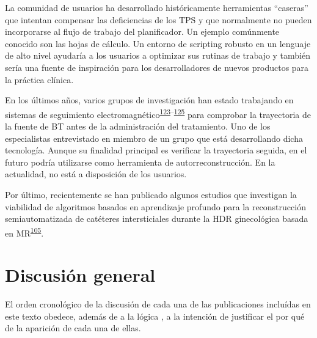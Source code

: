 \documentclass[
  a4paper,
]{scrreprt}
\begin{document}
La comunidad de usuarios ha desarrollado históricamente herramientas
``caseras'' que intentan compensar las deficiencias de los TPS y que
normalmente no pueden incorporarse al flujo de trabajo del planificador.
Un ejemplo comúnmente conocido son las hojas de cálculo. Un entorno de
scripting robusto en un lenguaje de alto nivel ayudaría a los usuarios a
optimizar sus rutinas de trabajo y también sería una fuente de
inspiración para los desarrolladores de nuevos productos para la
práctica clínica.

En los últimos años, varios grupos de investigación han estado
trabajando en sistemas de seguimiento
electromagnético\textsuperscript{\protect\hyperlink{ref-beld2018}{123}--\protect\hyperlink{ref-vanheerden2021}{125}}
para comprobar la trayectoria de la fuente de BT antes de la
administración del tratamiento. Uno de los especialistas entrevistado en
miembro de un grupo que está desarrollando dicha tecnología. Aunque su
finalidad principal es verificar la trayectoria seguida, en el futuro
podría utilizarse como herramienta de autorreconstrucción. En la
actualidad, no está a disposición de los usuarios.

Por último, recientemente se han publicado algunos estudios que
investigan la viabilidad de algoritmos basados en aprendizaje profundo
para la reconstrucción semiautomatizada de catéteres intersticiales
durante la HDR ginecológica basada en
MR\textsuperscript{\protect\hyperlink{ref-shaaer2021}{105}}.

\hypertarget{discusiuxf3n-general}{%
\section{Discusión general}\label{discusiuxf3n-general}}

El orden cronológico de la discusión de cada una de las publicaciones
incluídas en este texto obedece, además de a la lógica , a la intención
de justificar el por qué de la aparición de cada una de ellas.
\end{document}
